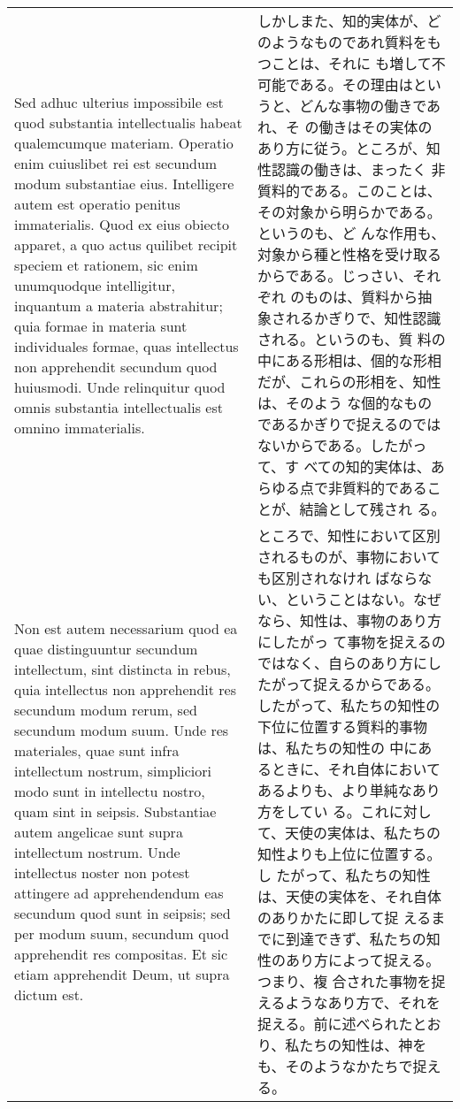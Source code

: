 \documentclass[10pt]{jsarticle} %
\begin{document}
\begin{longtable}{p{21em}p{21em}}
 \\

 Sed adhuc ulterius impossibile est quod substantia intellectualis
 habeat qualemcumque materiam. Operatio enim cuiuslibet rei est
 secundum modum substantiae eius. Intelligere autem est operatio
 penitus immaterialis. Quod ex eius obiecto apparet, a quo actus
 quilibet recipit speciem et rationem, sic enim unumquodque
 intelligitur, inquantum a materia abstrahitur; quia formae in materia
 sunt individuales formae, quas intellectus non apprehendit secundum
 quod huiusmodi. Unde relinquitur quod omnis substantia intellectualis
 est omnino immaterialis.


 &

 しかしまた、知的実体が、どのようなものであれ質料をもつことは、それに
 も増して不可能である。その理由はというと、どんな事物の働きであれ、そ
 の働きはその実体のあり方に従う。ところが、知性認識の働きは、まったく
 非質料的である。このことは、その対象から明らかである。というのも、ど
 んな作用も、対象から種と性格を受け取るからである。じっさい、それぞれ
 のものは、質料から抽象されるかぎりで、知性認識される。というのも、質
 料の中にある形相は、個的な形相だが、これらの形相を、知性は、そのよう
 な個的なものであるかぎりで捉えるのではないからである。したがって、す
 べての知的実体は、あらゆる点で非質料的であることが、結論として残され
 る。

\\

 Non est autem necessarium quod ea quae distinguuntur secundum
 intellectum, sint distincta in rebus, quia intellectus non
 apprehendit res secundum modum rerum, sed secundum modum suum. Unde
 res materiales, quae sunt infra intellectum nostrum, simpliciori modo
 sunt in intellectu nostro, quam sint in seipsis. Substantiae autem
 angelicae sunt supra intellectum nostrum. Unde intellectus noster non
 potest attingere ad apprehendendum eas secundum quod sunt in seipsis;
 sed per modum suum, secundum quod apprehendit res compositas. Et sic
 etiam apprehendit Deum, ut supra dictum est.


&

 ところで、知性において区別されるものが、事物においても区別されなけれ
 ばならない、ということはない。なぜなら、知性は、事物のあり方にしたがっ
 て事物を捉えるのではなく、自らのあり方にしたがって捉えるからである。
 したがって、私たちの知性の下位に位置する質料的事物は、私たちの知性の
 中にあるときに、それ自体においてあるよりも、より単純なあり方をしてい
 る。これに対して、天使の実体は、私たちの知性よりも上位に位置する。し
 たがって、私たちの知性は、天使の実体を、それ自体のありかたに即して捉
 えるまでに到達できず、私たちの知性のあり方によって捉える。つまり、複
 合された事物を捉えるようなあり方で、それを捉える。前に述べられたとお
 り、私たちの知性は、神をも、そのようなかたちで捉える。



\end{longtable}
\end{document}
